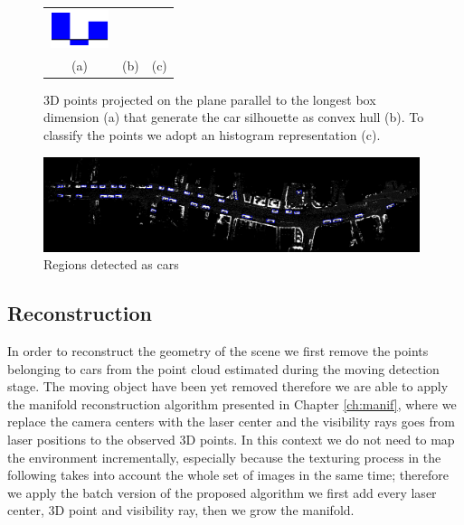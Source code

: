 \begin{figure}[tp]
\begin{tabular}{ccc}
        \includegraphics[width=0.98\textwidth]{./img/ch-laser/hist}\\
        (a)&(b)&(c)
    \end{tabular}
    \caption{3D points projected on the plane parallel to the longest box  dimension (a) that generate the car silhouette as convex hull (b). To classify the points we adopt an histogram representation (c).}
    \label{fig:convHull}
\end{figure}

\begin{figure}[tp]
 \centering
 \includegraphics[width=0.98\textwidth]{./img/ch-laser/drawing.png}
 \caption{Regions detected as cars}
 \label{fig:drawing}
\end{figure}


\subsection{Reconstruction}
In order to reconstruct the geometry of the scene we first remove the points belonging to cars from the point cloud estimated during the moving detection stage. The moving object have been yet removed therefore we are able to apply the manifold reconstruction algorithm presented in Chapter \ref{ch:manif}, where we replace the camera centers with the laser center and the visibility rays goes from laser positions to the observed 3D points.
In this context we do not  need to map the environment incrementally, especially because the texturing process in the following takes into account the whole set of images in the same time; therefore we apply the batch version of the proposed algorithm \ie we first add every laser center, 3D point and visibility ray, then we grow the manifold.

